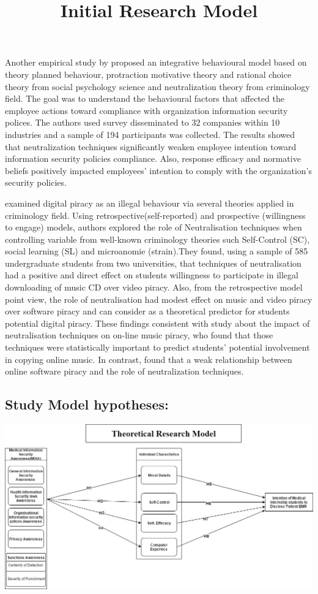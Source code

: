 Another empirical study by\citet{Kim2014} proposed an integrative behavioural model based on theory planned behaviour, protraction motivative theory and rational choice theory from social psychology science and neutralization theory from criminology field. The goal was to understand the behavioural factors that affected the employee actions toward compliance with organization information security polices. The authors used survey disseminated to 32 companies within 10 industries and a sample of 194 participants was collected. The results showed that neutralization techniques significantly weaken employee intention toward information security policies compliance. Also, response efficacy and normative beliefs positively impacted employees' intention to comply with the organization's security policies.

\citet{Morris} examined digital piracy as an illegal behaviour via several theories applied in criminology field. Using retrospective(self-reported) and prospective (willingness to engage) models, authors explored the role of Neutralisation techniques when controlling variable from  well-known criminology theories such Self-Control (SC), social learning (SL) and microanomie (strain).They found, using a sample of 585 undergraduate students from two universities, that techniques of neutralisation had a positive and direct effect on students willingness to participate in illegal downloading of music CD over video piracy. Also, from the retrospective model point view, the role of neutralisation had modest effect on music and video piracy over software piracy and can consider as a theoretical predictor for students potential digital piracy. These findings consistent with \cite{Ingram2008} study about the impact of neutralisation techniques on on-line music piracy, who found that those techniques were statistically important to predict students' potential involvement in copying online music. In contrast, \cite{Hinduja2007} found that a weak relationship between online software piracy and the role of neutralization techniques.     
 
\subsection{Study Model hypotheses:}
\graphicspath{ {image/} }
\begin{center}
\includegraphics [scale=0.4]{First_Research_Diagrame.jpg}
\end{center}
\begin{center}
\title{ Initial Research Model}
\end{center}

